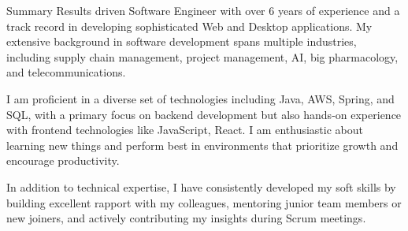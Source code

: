 \documentclass[]{mcdowellcv}
\begin{document}
   \makeheader

  \begin{cvsection}{Summary}
	    \hspace{\parindent} \hspace{\parindent} \hspace{\parindent} \hspace{\parindent} 
		Results driven Software Engineer with over 6 years of experience and a track record in developing sophisticated Web and Desktop applications. My extensive background in software development spans multiple industries, including supply chain management, project management, AI, big pharmacology, and telecommunications.

		I am proficient in a diverse set of technologies including Java, AWS, Spring, and SQL, with a primary focus on backend development but also hands-on experience with frontend technologies like JavaScript, React. I am enthusiastic about learning new things and perform best in environments that prioritize growth and encourage productivity.

		In addition to technical expertise, I have consistently developed my soft skills by building excellent rapport with my colleagues, mentoring junior team members or new joiners, and actively contributing my insights during Scrum meetings.
  \end{cvsection}
\end{document}
